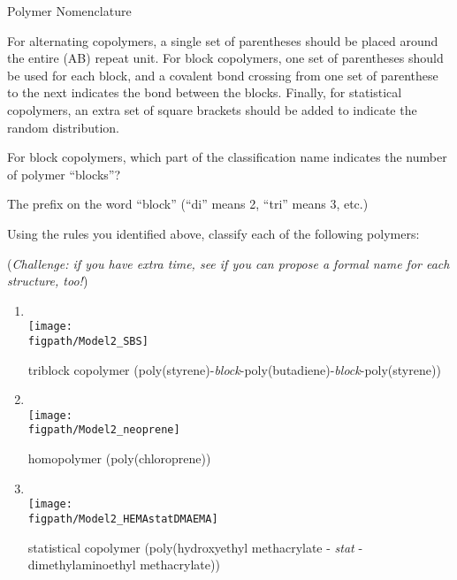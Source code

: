 \begin{activity}{Polymer Nomenclature}
\begin{ctqs}
\begin{enumerate}
				\begin{solution}[2in]
				For alternating copolymers, a single set of parentheses should be placed around the entire (AB) repeat unit.  For block copolymers, one set of parentheses should be used for each block, and a covalent bond crossing from one set of parenthese to the next indicates the bond between the blocks.  Finally, for statistical copolymers, an extra set of square brackets should be added to indicate the random distribution.
				\end{solution}
			
		\end{enumerate}
	
	\question For block copolymers, which part of the classification name indicates the number of polymer ``blocks''?
			
				\begin{solution}[0.5in]
				The prefix on the word ``block'' (``di'' means 2, ``tri'' means 3, etc.) 
				\end{solution}
		
	\question Using the rules you identified above, classify each of the following polymers: 
	
		(\emph{Challenge: if you have extra time, see if you can propose a formal name for each structure, too!})
	
		\begin{enumerate}
			\item \text{}\\\texttt{[image: \\figpath/Model2\_SBS]}
			
				\begin{solution}[0.25in]
					triblock copolymer (poly(styrene)-\emph{block}-poly(butadiene)-\emph{block}-poly(styrene))
				\end{solution}
			
			\item \text{}\\\texttt{[image: \\figpath/Model2\_neoprene]}
			
				\begin{solution}[0.25in]
					homopolymer (poly(chloroprene))
				\end{solution}
			
			\item \text{}\\\texttt{[image: \\figpath/Model2\_HEMAstatDMAEMA]}
			
				\begin{solution}[0.25in]
					statistical copolymer (poly(hydroxyethyl methacrylate - \emph{stat} - dimethylaminoethyl methacrylate))
				\end{solution}
			

\end{enumerate}
\end{ctqs}
\end{activity}
